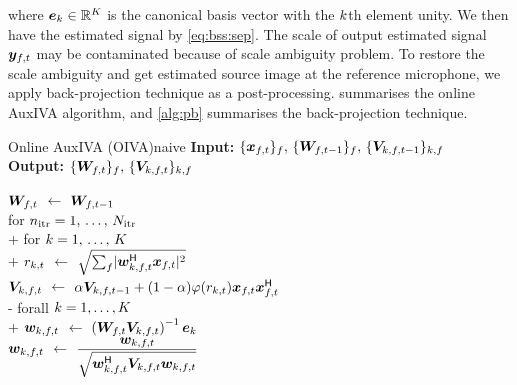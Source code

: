 \documentclass[sip,biber]{now-journal}
\begin{document}
where $\bm{e} _{k} \in \mathbb{R} ^{K}$ is the canonical basis vector with the $k$th element unity.
We then have the estimated signal by \eqref{eq:bss:sep}.
The scale of output estimated signal $\Est _{\ft}$ may be contaminated because of scale ambiguity problem.
To restore the scale ambiguity and get estimated source image at the reference microphone,
we apply back-projection technique \cite{Murata:2001:NC} as a post-processing.
 summarises the online AuxIVA algorithm, and \cref{alg:pb} summarises the back-projection technique.
\begin{algorithm}{Online AuxIVA (OIVA)}{naive}
  \textbf{Input:} $\{\Obs _{\ft}\} _{\freq},\, \{\Demix _{\ft[-1]}\}_{\freq},\, \{\cov _{\src,\ft[-1]}\}_{\src,\freq}$\\
  \textbf{Output:} $\{\Demix _{\ft}\}_{\freq},\, \{\cov _{\src,\ft}\}_{\src,\freq}$
  \begin{pseudo}
    {$\Demix _{\ft}$} $\gets$ $\Demix _{\ft[-1]}$ \ct{$(\forall \freq)$} \\
    for $n _{\mathrm{itr}} = 1,\, \dots,\, N _{\mathrm{itr}}$ \\+
      for $k = 1,\, \dots,\, K$ \\+
        {$r _{k,t}$} $\gets$ $\sqrt{\sum _{\freq} \abs{\demix _{\src,\ft} ^{\hermite} \Obs _{\ft}} ^2}$ \\
        {$\cov _{\src,\ft}    $} $\gets$ $\forget \cov _{\src,\ft[-1]} + (1 - \forget) \weight(\var _{\src,\tframe}) \Obs _{\ft} \Obs _{\ft} ^{\hermite}$ \ct{$(\forall \freq)$}\\-
      forall $k = 1, \dots, K$ \\+
        {$\demix _{\src,\ft}$} $\gets$ $\left(\Demix _{\ft} \cov _{\src,\ft}\right) ^{-1} \eye _{\src}$ \ct{$(\forall \freq)$}\\
        {$\demix _{\src,\ft}$} $\gets$ $\dfrac{\demix _{\src,\ft}}{\sqrt{\demix _{\src,\ft} ^{\hermite} \cov _{\src,\ft} \demix _{\src,\ft}}}$ \ct{$(\forall \freq)$}
  \end{pseudo}
\end{algorithm}
\end{document}
